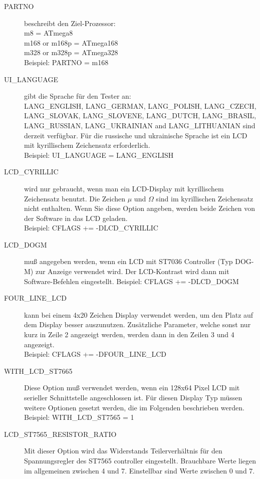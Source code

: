 \begin{description}
  \item[PARTNO] beschreibt den Ziel-Prozessor:\\
         m8 = ATmega8\\
         m168 or m168p = ATmega168\\
         m328 or m328p = ATmega328\\
    Beispiel: PARTNO = m168
  \item[UI\_LANGUAGE] gibt die Sprache für den Tester an:\\
    LANG\_ENGLISH, LANG\_GERMAN, LANG\_POLISH, LANG\_CZECH, LANG\_SLOVAK, LANG\_SLOVENE, LANG\_DUTCH, LANG\_BRASIL,
 LANG\_RUSSIAN, LANG\_UKRAINIAN and LANG\_LITHUANIAN sind derzeit verfügbar.
 Für die russische und ukrainische Sprache ist ein LCD mit kyrillischem Zeichensatz erforderlich.\\
    Beispiel: UI\_LANGUAGE = LANG\_ENGLISH
  \item[LCD\_CYRILLIC] wird nur gebraucht, wenn man ein LCD-Display mit kyrillischem Zeichensatz benutzt.
Die Zeichen \(\mu\) und \(\Omega\) sind im kyrillischen Zeichensatz nicht enthalten.
Wenn Sie diese Option angeben, werden beide Zeichen von der Software in das LCD geladen.\\
Beispiel: CFLAGS += -DLCD\_CYRILLIC
  \item[LCD\_DOGM] muß angegeben werden, wenn ein LCD mit ST7036 Controller (Typ DOG-M) zur Anzeige verwendet wird.
Der LCD-Kontrast wird dann mit Software-Befehlen eingestellt.
Beispiel: CFLAGS += -DLCD\_DOGM
  \item[FOUR\_LINE\_LCD] kann bei einem 4x20 Zeichen Display verwendet werden, um den Platz auf dem Display
besser auszunutzen. Zusätzliche Parameter, welche sonst nur kurz in Zeile 2 angezeigt werden, werden dann in
den Zeilen 3 und 4 angezeigt.\\
Beispiel: CFLAGS += -DFOUR\_LINE\_LCD
  \item[WITH\_LCD\_ST7665] Diese Option muß verwendet werden, wenn ein 128x64 Pixel LCD mit serieller
Schnittstelle angeschlossen ist. Für diesen Display Typ müssen weitere Optionen gesetzt werden, die im Folgenden
beschrieben werden.\\
Beispiel: WITH\_LCD\_ST7565 = 1 
  \item[LCD\_ST7565\_RESISTOR\_RATIO] Mit dieser Option wird das Widerstands Teilerverhältnis für den
Spannungsregler des ST7565 controller eingestellt. Brauchbare Werte liegen im allgemeinen zwischen 4 und 7.
Einstellbar sind Werte zwischen 0 und 7.\\

\end{description}
